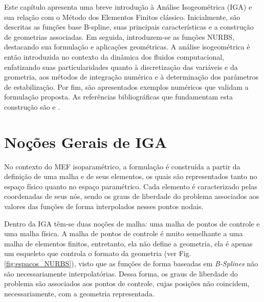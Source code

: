 \documentclass[tese_patricia]{subfiles}
\begin{document}
Este capítulo apresenta uma breve introdução à Análise Isogeométrica (IGA) e sua relação com o Método dos Elementos Finitos clássico. Inicialmente, são descritas as funções base B-spline, suas principais características e a construção de geometrias associadas. Em seguida, introduzem-se as funções NURBS, destacando sua formulação e aplicações geométricas. A análise isogeométrica é então introduzida no contexto da dinâmica dos fluidos computacional, enfatizando suas particularidades quanto à discretização das variáveis e da geometria, aos métodos de integração numérica e à determinação dos parâmetros de estabilização. Por fim, são apresentados exemplos numéricos que validam a formulação proposta. As referências bibliográficas que fundamentam esta construção são  e . 


\section{Noções Gerais de IGA}

No contexto do MEF isoparamétrico, a formulação é construída a partir da definição de uma malha e de seus elementos, os quais são representados tanto no espaço físico quanto no espaço paramétrico. Cada elemento é caracterizado pelas coordenadas de seus nós, sendo os graus de liberdade do problema associados aos valores das funções de forma interpolados nesses pontos nodais.

Dentro da IGA têm-se duas noções de malha: uma malha de pontos de controle e uma malha física. A malha de pontos de controle é muito semelhante a uma malha de elementos finitos, entretanto, ela não define a geometria, ela é apenas um esqueleto que controla o formato da geometria (ver Fig. \ref{fig:espacos_NURBS}), visto que as funções de forma baseadas em \textit{B-Splines} não são necessariamente interpolatórias. Dessa forma, os graus de liberdade do problema são associados aos pontos de controle, cujas posições não coincidem, necessariamente, com a geometria representada.
\end{document}
